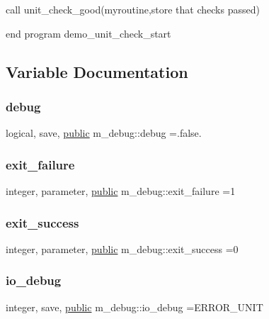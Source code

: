 call unit\+\_\+check\+\_\+good(\textquotesingle{}myroutine\textquotesingle{},\textquotesingle{}store that checks passed\textquotesingle{})

end program demo\+\_\+unit\+\_\+check\+\_\+start 

\subsection{Variable Documentation}
\mbox{\label{namespacem__debug_aa13827e130b8e8bde8a8597e3d3faa0c}} 
\subsubsection{\texorpdfstring{debug}{debug}}
{\footnotesize\ttfamily logical, save, \hyperlink{M__stopwatch_83_8txt_a2f74811300c361e53b430611a7d1769f}{public} m\+\_\+debug\+::debug =.false.}

\mbox{\label{namespacem__debug_a884bfce2d57734eb9f07e8a99d4ffaeb}} 
\subsubsection{\texorpdfstring{exit\+\_\+failure}{exit\_failure}}
{\footnotesize\ttfamily integer, parameter, \hyperlink{M__stopwatch_83_8txt_a2f74811300c361e53b430611a7d1769f}{public} m\+\_\+debug\+::exit\+\_\+failure =1}

\mbox{\label{namespacem__debug_a9f9aab455ab97238c80d66dd9ed65a7d}} 
\subsubsection{\texorpdfstring{exit\+\_\+success}{exit\_success}}
{\footnotesize\ttfamily integer, parameter, \hyperlink{M__stopwatch_83_8txt_a2f74811300c361e53b430611a7d1769f}{public} m\+\_\+debug\+::exit\+\_\+success =0}

\mbox{\label{namespacem__debug_ab9d95afd83b30688892f4c818ee8c312}} 
\subsubsection{\texorpdfstring{io\+\_\+debug}{io\_debug}}
{\footnotesize\ttfamily integer, save, \hyperlink{M__stopwatch_83_8txt_a2f74811300c361e53b430611a7d1769f}{public} m\+\_\+debug\+::io\+\_\+debug =E\+R\+R\+O\+R\+\_\+\+U\+N\+IT}

